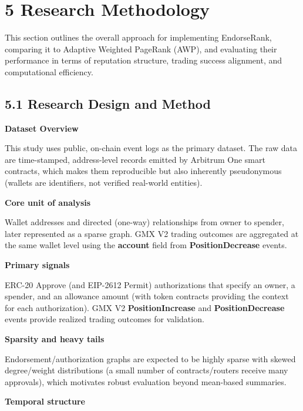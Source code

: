 \clearpage
{}
\section*{5 \textbf{Research Methodology}}
\label{sec:research-methodology}

This section outlines the overall approach for implementing EndorseRank, comparing it to Adaptive Weighted PageRank (AWP), and evaluating their performance in terms of reputation structure, trading success alignment, and computational efficiency.


\subsection*{5.1 Research Design and Method}
\label{sec:research-design-and-method}

\textbf{Dataset Overview}


This study uses public, on-chain event logs as the primary dataset. The raw data are time-stamped, address-level records emitted by Arbitrum One smart contracts, which makes them reproducible but also inherently pseudonymous (wallets are identifiers, not verified real-world entities).


\textbf{Core unit of analysis}


Wallet addresses and directed (one-way) relationships from owner to spender, later represented as a sparse graph. GMX V2 trading outcomes are aggregated at the same wallet level using the \textbf{account} field from \textbf{PositionDecrease} events.


\textbf{Primary signals}


ERC-20 Approve (and EIP-2612 Permit) authorizations that specify an owner, a spender, and an allowance amount (with token contracts providing the context for each authorization). GMX V2 \textbf{PositionIncrease} and \textbf{PositionDecrease} events provide realized trading outcomes for validation.


\textbf{Sparsity and heavy tails}


Endorsement/authorization graphs are expected to be highly sparse with skewed degree/weight distributions (a small number of contracts/routers receive many approvals), which motivates robust evaluation beyond mean-based summaries.


\textbf{Temporal structure}


